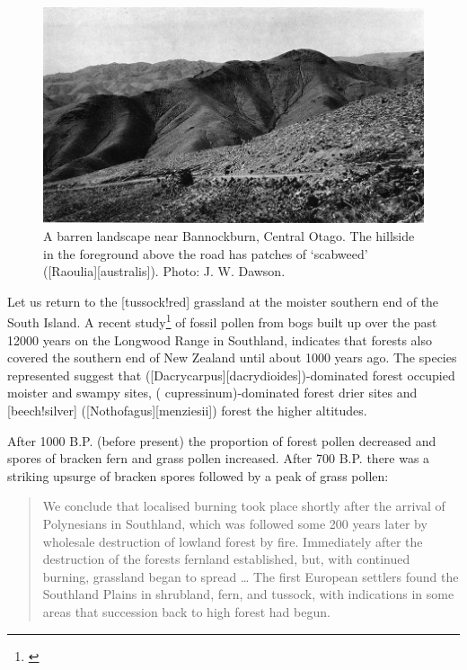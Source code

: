 \begin{figure}[t]
	\centering
	\includegraphics[width=\textwidth]{graphics/figure86barren.jpg}
	\caption[A barren landscape near Bannockburn]{A barren landscape near Bannockburn, Central Otago.
	The hillside in the foreground above the road has patches of `scabweed' ([Raoulia][australis]).
	Photo:  J. W. Dawson.}%
	\label{fig:86barren}
\end{figure}

Let us return to the [tussock!red] grassland at the moister southern end of the South Island.
A recent study\footnote{\cite{mcglone1983vegetation}} of fossil pollen from bogs built up over the past 12000 years on the Longwood Range in Southland, indicates that forests also covered the southern end of New Zealand until about 1000 years ago.
The species represented suggest that  ([Dacrycarpus][dacrydioides])-dominated forest occupied moister and swampy sites,  ( cupressinum)-dominated forest drier sites and [beech!silver] ([Nothofagus][menziesii]) forest the higher altitudes.

After 1000 B.P. (before present) the proportion of forest pollen decreased and spores of bracken fern and grass pollen increased.
After 700 B.P. there was a striking upsurge of bracken spores followed by a peak of grass pollen:

\begin{quote}
	We conclude that localised burning took place shortly after the arrival of Polynesians in Southland, which was followed some 200 years later by wholesale destruction of lowland forest by fire.
	Immediately after the destruction of the forests fernland established, but, with continued burning, grassland began to spread … The first European settlers found the Southland Plains in shrubland, fern, and tussock, with indications in some areas that succession back to high forest had begun.
\end{quote}

